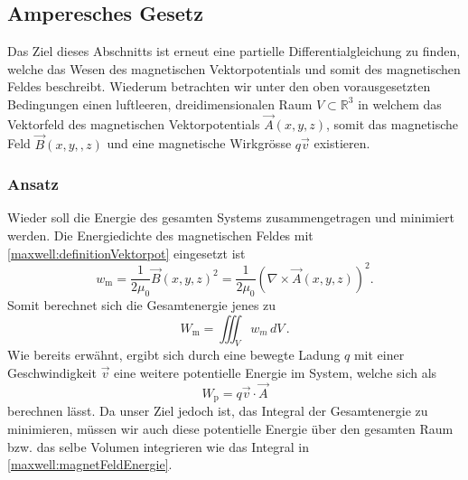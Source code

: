 

\subsection{Amperesches Gesetz}
Das Ziel dieses Abschnitts ist erneut eine partielle Differentialgleichung zu finden, welche das Wesen des magnetischen Vektorpotentials und somit des magnetischen Feldes beschreibt.
Wiederum betrachten wir unter den oben vorausgesetzten Bedingungen einen luftleeren, dreidimensionalen Raum $V \subset \mathbb{R}^3$ in welchem das Vektorfeld des magnetischen Vektorpotentials $\vec{A}(x,y,z)$, somit das magnetische Feld $\vec{B}(x,y,,z)$ und eine magnetische Wirkgrösse $q\vec{v}$  existieren. 

\subsubsection{Ansatz}

Wieder soll die Energie des gesamten Systems zusammengetragen und minimiert werden. 
Die Energiedichte des magnetischen Feldes mit \ref{maxwell:definitionVektorpot} eingesetzt ist
\[ w_{\text{m}} 
= 
\frac{1}{2\mu_0}\vec{B}(x,y,z)^2
=
\frac{1}{2\mu_0}\left(\nabla\times\vec{A}(x,y,z)\right)^2. \]
Somit berechnet sich die Gesamtenergie jenes zu 
\begin{equation}
	\label{maxwell:magnetFeldEnergie}
	W_{\text{m}} = \iiint_V w_m\, dV\,.
\end{equation}
Wie bereits erwähnt, ergibt sich durch eine bewegte Ladung $q$ mit einer Geschwindigkeit $\vec{v}$ eine weitere potentielle Energie im System, welche sich als 
\[ 
W_{\text{p}}
= 
q\vec{v}
\cdot
\vec{A}
 \]
berechnen lässt.
Da unser Ziel jedoch ist, das Integral der Gesamtenergie zu minimieren, müssen wir auch diese potentielle Energie über den gesamten Raum bzw. das selbe Volumen integrieren wie das Integral in \ref{maxwell:magnetFeldEnergie}. 

